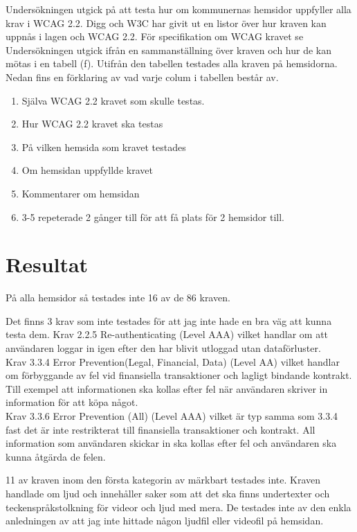 \documentclass[11p]{article}
\begin{document}
    Undersökningen utgick på att testa hur om kommunernas hemsidor uppfyller alla krav i WCAG 2.2.
    Digg och W3C har givit ut en listor över hur kraven kan uppnås i lagen och WCAG 2.2.
    För specifikation om WCAG kravet se \textcite{WCAG_2.2}
    Undersökningen utgick ifrån en sammanställning över kraven och hur de kan mötas i en tabell (f).
    Utifrån den tabellen testades alla kraven på hemsidorna.
    Nedan fins en förklaring av vad varje colum i tabellen består av.
    \begin{enumerate}
        \item Själva WCAG 2.2 kravet som skulle testas.
        \item Hur WCAG 2.2 kravet ska testas
        \item På vilken hemsida som kravet testades
        \item Om hemsidan uppfyllde kravet
        \item Kommentarer om hemsidan
        \item 3-5 repeterade 2 gånger till för att få plats för 2 hemsidor till.
    \end{enumerate}

    \section{Resultat}

    På alla hemsidor så testades inte 16 av de 86 kraven.

    Det finns 3 krav som inte testades för att jag inte hade en bra väg att kunna testa dem.
    Krav 2.2.5 Re-authenticating (Level AAA) vilket handlar om att användaren loggar in igen efter den har blivit utloggad utan dataförluster.
   \\ Krav 3.3.4 Error Prevention(Legal, Financial, Data) (Level AA) vilket handlar om förbyggande av fel vid finansiella transaktioner och lagligt bindande kontrakt.
    Till exempel att informationen ska kollas efter fel när användaren skriver in information för att köpa något.
  \\  Krav 3.3.6 Error Prevention (All) (Level AAA) vilket är typ samma som 3.3.4 fast det är inte restrikterat till finansiella transaktioner och kontrakt.
    All information som användaren skickar in ska kollas efter fel och användaren ska kunna åtgärda de felen.

    11 av kraven inom den första kategorin av märkbart testades inte.
    Kraven handlade om ljud och innehåller saker som att det ska finns undertexter och teckenspråkstolkning för videor och ljud med mera.
    De testades inte av den enkla anledningen av att jag inte hittade någon ljudfil eller videofil på hemsidan.
\end{document}

